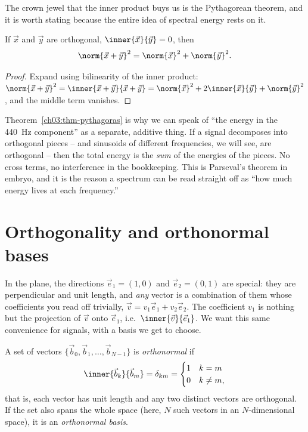 The crown jewel that the inner product buys us is the Pythagorean theorem, and it is worth stating
because the entire idea of spectral energy rests on it.

\begin{theorem}
\label{ch03:thm-pythagoras}
If $\vec{x}$ and $\vec{y}$ are orthogonal, $\inner{\vec{x}}{\vec{y}}=0$, then
\[
  \norm{\vec{x}+\vec{y}}^2 = \norm{\vec{x}}^2 + \norm{\vec{y}}^2 .
\]
\end{theorem}

\begin{proof}
Expand using bilinearity of the inner product:
$\norm{\vec{x}+\vec{y}}^2 = \inner{\vec{x}+\vec{y}}{\vec{x}+\vec{y}}
= \norm{\vec{x}}^2 + 2\inner{\vec{x}}{\vec{y}} + \norm{\vec{y}}^2$, and the middle term vanishes.
\end{proof}

\begin{aestheticbox}
Theorem~\ref{ch03:thm-pythagoras} is why we can speak of ``the energy in the 440~Hz component'' as a
separate, additive thing. If a signal decomposes into orthogonal pieces -- and sinusoids of
different frequencies, we will see, are orthogonal -- then the total energy is the \emph{sum} of the
energies of the pieces. No cross terms, no interference in the bookkeeping. This is Parseval's
theorem in embryo, and it is the reason a spectrum can be read straight off as ``how much energy lives at
each frequency.''
\end{aestheticbox}

\section{Orthogonality and orthonormal bases}
\label{ch03:ortho}

In the plane, the directions $\vec{e}_1=(1,0)$ and $\vec{e}_2=(0,1)$ are special: they are
perpendicular and unit length, and \emph{any} vector is a combination of them whose coefficients you
read off trivially, $\vec{v}=v_1\vec{e}_1+v_2\vec{e}_2$. The coefficient $v_1$ is nothing but the
projection of $\vec{v}$ onto $\vec{e}_1$, i.e.\ $\inner{\vec{v}}{\vec{e}_1}$. We want this same
convenience for signals, with a basis we get to choose.

\begin{definition}
\label{ch03:def-onb}
A set of vectors $\{\vec{b}_0,\vec{b}_1,\dots,\vec{b}_{N-1}\}$ is \emph{orthonormal} if
\[
  \inner{\vec{b}_k}{\vec{b}_m} = \delta_{km} =
  \begin{cases} 1 & k=m \\ 0 & k\neq m, \end{cases}
\]
that is, each vector has unit length and any two distinct vectors are orthogonal. If the set also
spans the whole space (here, $N$ such vectors in an $N$-dimensional space), it is an
\emph{orthonormal basis}.
\end{definition}

